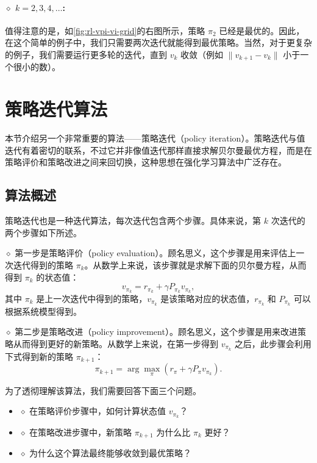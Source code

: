 \paragraph{$\diamond$ $k = 2, 3, 4, \ldots$:}

值得注意的是，如\cref{fig:rl-vpi-vi-grid}的右图所示，策略 $\pi_2$ 已经是最优的。因此，在这个简单的例子中，我们只需要两次迭代就能得到最优策略。当然，对于更复杂的例子，我们需要运行更多轮的迭代，直到 $v_{k}$ 收敛（例如 $\|v_{k+1} - v_{k}\|$ 小于一个很小的数）。

\section{策略迭代算法}
\label{sec:rl-vpi-policy-iteration}

本节介绍另一个非常重要的算法——策略迭代（policy iteration）。策略迭代与值迭代有着密切的联系，不过它并非像值迭代那样直接求解贝尔曼最优方程，而是在策略评价和策略改进之间来回切换，这种思想在强化学习算法中广泛存在。

\subsection{算法概述}
\label{sec:rl-vpi-pi-overview}

策略迭代也是一种迭代算法，每次迭代包含两个步骤。具体来说，第 $k$ 次迭代的两个步骤如下所述。

$\diamond$ 第一步是策略评价（policy evaluation）。顾名思义，这个步骤是用来评估上一次迭代得到的策略 $\pi_{k}$。从数学上来说，该步骤就是求解下面的贝尔曼方程，从而得到 $\pi_{k}$ 的状态值：
\begin{equation}
\label{eq:rl-vpi-pe-bellman}
v_{\pi_{k}} = r_{\pi_{k}} + \gamma P_{\pi_{k}} v_{\pi_{k}},
\end{equation}
其中 $\pi_{k}$ 是上一次迭代中得到的策略，$v_{\pi_{k}}$ 是该策略对应的状态值，$r_{\pi_{k}}$ 和 $P_{\pi_{k}}$ 可以根据系统模型得到。

$\diamond$ 第二步是策略改进（policy improvement）。顾名思义，这个步骤是用来改进策略从而得到更好的新策略。从数学上来说，在第一步得到 $v_{\pi_{k}}$ 之后，此步骤会利用下式得到新的策略 $\pi_{k+1}$：
\begin{equation}
\pi_{k+1} = \arg\max_{\pi} (r_{\pi} + \gamma P_{\pi} v_{\pi_{k}}).
\end{equation}

为了透彻理解该算法，我们需要回答下面三个问题。

\begin{itemize}
\item $\diamond$ 在策略评价步骤中，如何计算状态值 $v_{\pi_{k}}$？
\item $\diamond$ 在策略改进步骤中，新策略 $\pi_{k+1}$ 为什么比 $\pi_{k}$ 更好？
\item $\diamond$ 为什么这个算法最终能够收敛到最优策略？
\end{itemize}

